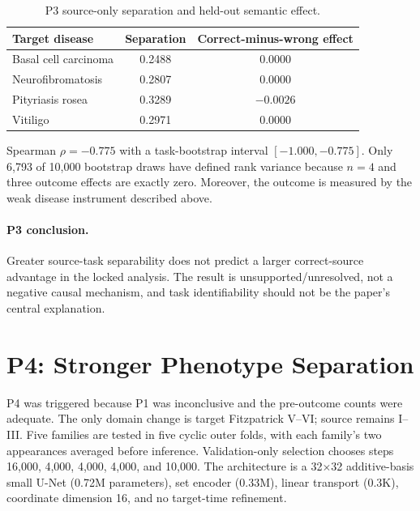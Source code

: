 \documentclass{article}
\begin{document}
\begin{table}[h]
\caption{P3 source-only separation and held-out semantic effect.}
\label{tab:p3}
\centering
\scriptsize
\begin{tabular}{lcc}
\toprule
Target disease & Separation & Correct-minus-wrong effect \\
\midrule
Basal cell carcinoma & 0.2488 & 0.0000 \\
Neurofibromatosis & 0.2807 & 0.0000 \\
Pityriasis rosea & 0.3289 & $-0.0026$ \\
Vitiligo & 0.2971 & 0.0000 \\
\bottomrule
\end{tabular}
\end{table}

Spearman $\rho=-0.775$ with a task-bootstrap interval $[-1.000,-0.775]$.  Only 6,793 of
10,000 bootstrap draws have defined rank variance because $n=4$ and three outcome effects are
exactly zero.  Moreover, the outcome is measured by the weak disease instrument described
above.

\paragraph{P3 conclusion.}
Greater source-task separability does not predict a larger correct-source advantage in the
locked analysis.  The result is unsupported/unresolved, not a negative causal mechanism, and
task identifiability should not be the paper's central explanation.

\section{P4: Stronger Phenotype Separation}

P4 was triggered because P1 was inconclusive and the pre-outcome counts were adequate.  The
only domain change is target Fitzpatrick V--VI; source remains I--III.  Five families are
tested in five cyclic outer folds, with each family's two appearances averaged before
inference.  Validation-only selection chooses steps 16,000, 4,000, 4,000, 4,000, and 10,000.
The architecture is a 32$\times$32 additive-basis small U-Net (0.72M parameters), set encoder
(0.33M), linear transport (0.3K), coordinate dimension 16, and no target-time refinement.
\end{document}
